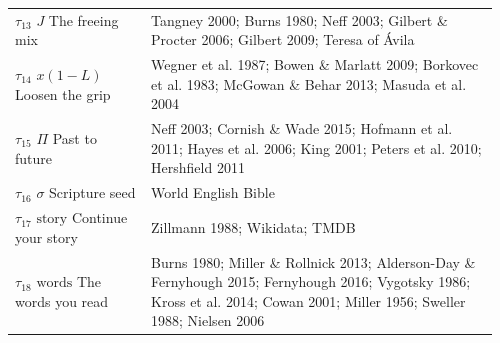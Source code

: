 \documentclass[10pt]{article}
\theoremstyle{remark}
\begin{document}
{\begin{tabular}{@{}p{0.27\linewidth}p{0.69\linewidth}@{}}
\textcolor{mfpurple}{$\tau_{13}$ $J$} The freeing mix & Tangney 2000; Burns 1980; Neff 2003; Gilbert \& Procter 2006; Gilbert 2009; Teresa of \'Avila\\
\textcolor{mfpurple}{$\tau_{14}$ $x(1-L)$} Loosen the grip & Wegner et al. 1987; Bowen \& Marlatt 2009; Borkovec et al. 1983; McGowan \& Behar 2013; Masuda et al. 2004\\
\textcolor{mfpurple}{$\tau_{15}$ $\Pi$} Past to future & Neff 2003; Cornish \& Wade 2015; Hofmann et al. 2011; Hayes et al. 2006; King 2001; Peters et al. 2010; Hershfield 2011\\
\textcolor{mforange}{$\tau_{16}$ $\sigma$} Scripture seed & World English Bible\\
\textcolor{mforange}{$\tau_{17}$ $\mathrm{story}$} Continue your story & Zillmann 1988; Wikidata; TMDB\\
\textcolor{mfblue}{$\tau_{18}$ $\mathrm{words}$} The words you read & Burns 1980; Miller \& Rollnick 2013; Alderson-Day \& Fernyhough 2015; Fernyhough 2016; Vygotsky 1986; Kross et al. 2014; Cowan 2001; Miller 1956; Sweller 1988; Nielsen 2006\\
\hline
\end{tabular}}
\end{document}
